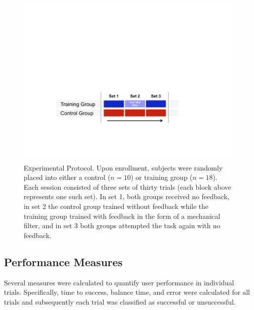 \begin{figure}[t]
\centering
\includegraphics[width=0.7\columnwidth]{Exp_Protocol_MIG.pdf}
\caption{Experimental Protocol. Upon enrollment, subjects were randomly placed into either a control ($n=10$) or training group ($n=18$). Each session consisted of three sets of thirty trials (each block above represents one such set). In set 1, both groups received no feedback, in set 2 the control group trained without feedback while the training group trained with feedback in the form of a mechanical filter, and in set 3 both groups attempted the task again with no feedback.}
\label{fig: exp_protocol}
\end{figure}



\subsection{Performance Measures}\label{metrics}

Several measures were calculated to quantify user performance in individual trials. Specifically, time to success, balance time, and error were calculated for all trials and subsequently each trial was classified as successful or unsuccessful. 

